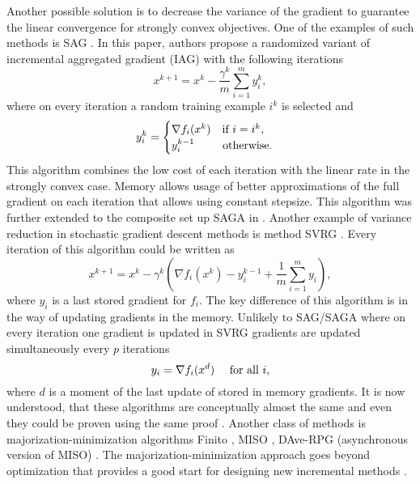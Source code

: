 Another possible solution is to decrease the variance of the gradient to guarantee the linear convergence for strongly convex objectives. One of the examples of such methods is SAG \cite{schmidt2017minimizing}. In this paper, authors propose a randomized variant of incremental aggregated gradient (IAG) \cite{blatt2007convergent} with the following iterations
$$
x^{k+1} = x^k - \frac{\gamma^k}{m}\sum_{i=1}^m y_i^k,
$$
where on every iteration a random training example $i^k$ is selected and 
$$
y_i^k = \begin{cases} \nabla f_i(x^k)~~~\textnormal{if }i = i^k,\\y_i^{k-1}~~~~~~~\,\textnormal{otherwise.}\end{cases}
$$
This algorithm combines the low cost of each iteration with the linear rate in the strongly convex case.
Memory allows usage of better approximations of the full gradient on each iteration that allows using constant stepsize. This algorithm was further extended to the composite set up SAGA in \cite{defazio2014saga}. Another example of variance reduction in stochastic gradient descent methods is method SVRG \cite{johnson2013accelerating}. Every iteration of this algorithm could be written as
$$
x^{k+1} = x^k -\gamma^k\left(\nabla f_i(x^k) - y_i^{k-1} + \frac{1}{m}\sum_{i=1}^m y_i\right),
$$
where $y_i$ is a last stored gradient for $f_i$. The key difference of this algorithm is in the way of updating gradients in the memory. Unlikely to SAG/SAGA where on every iteration one gradient is updated in SVRG gradients are updated simultaneously every $p$ iterations
$$
y_i = \nabla f_i(x^d)~~~~\textnormal{for all }i,
$$
where $d$ is a moment of the last update of stored in memory gradients. It is now understood, that these algorithms are conceptually almost the same and even they could be proven using the same proof \cite{kovalev2019don, hofmann2015variance}. Another class of methods is majorization-minimization algorithms Finito \cite{defazio2014finito}, MISO \cite{mairal2015incremental}, DAve-RPG (asynchronous version of MISO) \cite{mishchenko2018}. The majorization-minimization approach goes beyond optimization that provides a good start for designing new incremental methods \cite{qian2019miso}.